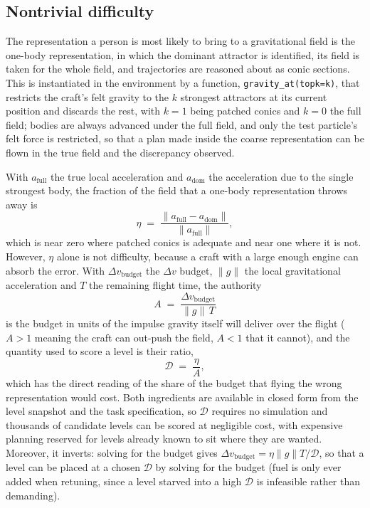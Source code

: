\documentclass[11pt]{article}
\newcommand{\dd}{\mathcal{D}}
\newcommand{\code}[1]{\texttt{\small #1}}
\begin{document}
\subsection{Nontrivial difficulty}
\label{sec:eta}

The representation a person is most likely to bring to a gravitational field
is the one-body representation, in which the dominant attractor is identified,
its field is taken for the whole field, and trajectories are reasoned about
as conic sections. This is instantiated in the environment by a function,
\code{gravity\_at(topk=k)}, that restricts the craft's felt gravity to the
$k$ strongest attractors at its current position and discards the rest, with
$k = 1$ being patched conics and $k = 0$ the full field; bodies are always
advanced under the full field, and only the test particle's felt force is restricted, so that a
plan made inside the coarse representation can be flown in the true field
and the discrepancy observed.

With $a_{\mathrm{full}}$ the true local acceleration and $a_{\mathrm{dom}}$
the acceleration due to the single strongest body, the fraction of the field
that a one-body representation throws away is
\begin{equation}
\eta \;=\; \frac{\lVert a_{\mathrm{full}} - a_{\mathrm{dom}} \rVert}
{\lVert a_{\mathrm{full}} \rVert},
\end{equation}
which is near zero where patched conics is adequate and near one where it is
not. However, $\eta$ alone is not difficulty, because a craft with a large
enough engine can absorb the error. With $\Delta v_{\mathrm{budget}}$ the
$\Delta v$ budget, $\lVert g \rVert$ the local gravitational
acceleration and $T$ the remaining flight time, the authority
\begin{equation}
A \;=\; \frac{\Delta v_{\mathrm{budget}}}{\lVert g\rVert\, T}
\end{equation}
is the budget in units of the impulse gravity itself will deliver over the
flight ($A > 1$ meaning the craft can out-push the field, $A < 1$ that it
cannot), and the quantity used to score a level is their ratio,
\begin{equation}
\dd \;=\; \frac{\eta}{A},
\end{equation}
which has the direct reading of the share of the budget that flying the wrong
representation would cost. Both ingredients are available in closed form from
the level snapshot and the task specification, so $\dd$ requires no
simulation and thousands of candidate levels can be scored at negligible cost, with
expensive planning reserved for levels already known to sit where they are
wanted. Moreover, it inverts: solving for the budget gives
$\Delta v_{\mathrm{budget}} = \eta \lVert g \rVert T / \dd$, so that a level
can be placed at a chosen $\dd$ by solving for the budget (fuel is only ever
added when retuning, since a level starved into a high $\dd$ is infeasible
rather than demanding).
\end{document}
